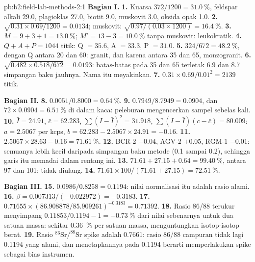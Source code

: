 \begin{solution}{pb:b2:field-lab-methods-2:1}
\noindent\textbf{Bagian I.}
\textbf{1.} Kuarsa $372/1200 = \qty{31.0}{\percent}$, feldspar alkali 29.0, plagioklas 27.0, biotit
9.0, muskovit 3.0, oksida opak 1.0.
\textbf{2.} $\sqrt{0.31 \times 0.69/1200} = 0.0134$; muskovit: $\sqrt{0.97/(0.03 \times 1200)} =
\qty{16.4}{\percent}$.
\textbf{3.} $M = 9 + 3 + 1 = \qty{13.0}{\percent}$; $M' = 13 - 3 = \qty{10.0}{\percent}$ tanpa
muskovit: leukokratik.
\textbf{4.} $Q + A + P = 1044$ titik: Q $= 35.6$, A $= 33.3$, P $= 31.0$.
\textbf{5.} $324/672 = \qty{48.2}{\percent}$, dengan Q antara 20 dan 60: granit, dan karena antara 35 dan
65, monzogranit.
\textbf{6.} $\sqrt{0.482 \times 0.518/672} = 0.0193$: batas-batas pada 35 dan 65 terletak 6.9 dan 8.7
simpangan baku jauhnya. Nama itu meyakinkan.
\textbf{7.} $0.31 \times 0.69/0.01^2 = 2139$ titik.

\noindent\textbf{Bagian II.}
\textbf{8.} $0.0051/0.8000 = \qty{0.64}{\percent}$.
\textbf{9.} $0.7949/8.7949 = 0.0904$, dan $72 \times 0.0904 = \qty{6.51}{\percent}$  di dalam
kaca: peleburan mengencerkan sampel sebelas kali.
\textbf{10.} $\bar I = 24.91$, $\bar c = 62.283$, $\sum(I - \bar I)^2 = 31.918$, $\sum(I - \bar I)(c -
\bar c) = 80.009$: $a = 2.5067$ per kcps, $b = 62.283 - 2.5067 \times 24.91 = -0.16$.
\textbf{11.} $2.5067 \times 28.63 - 0.16 = \qty{71.61}{\percent}$.
\textbf{12.} BCR-2 $-0.04$, AGV-2 $+0.05$, RGM-1 $-0.01$: semuanya lebih kecil daripada simpangan baku
metode (0.1 sampai 0.2), sehingga garis itu memadai dalam rentang ini.
\textbf{13.} $71.61 + 27.15 + 0.64 = \qty{99.40}{\percent}$, antara 97 dan 101: tidak diulang.
\textbf{14.} $71.61 \times 100/(71.61 + 27.15) = \qty{72.51}{\percent}$.

\noindent\textbf{Bagian III.}
\textbf{15.} $0.0986/0.8258 = 0.1194$: nilai normalisasi itu adalah rasio alami.
\textbf{16.} $\beta = 0.007313/(-0.022972) = -0.3183$.
\textbf{17.} $0.71655 \times (86.908878/85.909261)^{-0.3183} = 0.71392$.
\textbf{18.} Rasio 86/88 terukur menyimpang $0.11853/0.1194 - 1 = \qty{-0.73}{\percent}$ dari nilai sebenarnya
untuk dua satuan massa: sekitar \qty{0.36}{\percent} per satuan massa, menguntungkan isotop-isotop berat.
\textbf{19.} Rasio $^{86}\mathrm{Sr}/^{88}\mathrm{Sr}$ spike adalah 0.7661: rasio 86/88 campuran tidak lagi
0.1194 yang alami, dan menetapkannya pada 0.1194 berarti memperlakukan spike sebagai bias instrumen.


\end{solution}
